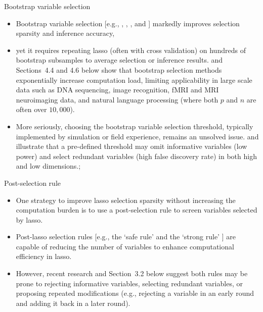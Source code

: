 \documentclass{beamer}
\begin{document}
\begin{frame}{Bootstrap variable selection}
  \begin{itemize}
      \item Bootstrap variable selection [e.g., \citet{bach2008bolasso}, \citet{meinshausen2010stability}, \citet{wang2011random}, and \citet{mameli2017estimating}] markedly improves selection sparsity and inference accuracy,
      \item yet it requires repeating lasso (often with cross validation) on hundreds of bootstrap subsamples to average selection or inference results. \citet{xu2012asymptotic} and Sections~4.4 and 4.6 below show that bootstrap selection methods exponentially increase computation load, limiting applicability in large scale data such as DNA sequencing, image recognition, fMRI and MRI neuroimaging data, and natural language processing (where both $p$ and $n$ are often over $10,000$). 
      \item More seriously, choosing the bootstrap variable selection threshold, typically implemented by simulation or field experience, remains an unsolved issue. \citet{bach2008bolasso} and \citet[Figure~2]{huang2014stat} illustrate that a pre-defined threshold may omit informative variables (low power) and select redundant variables (high false discovery rate) in both high and low dimensions.;
  \end{itemize}
\end{frame}


\begin{frame}{Post-selection rule}
  \begin{itemize}
    \item One strategy to improve lasso selection sparsity without increasing the computation burden is to use a post-selection rule to screen variables selected by lasso. 
    
    \item Post-lasso selection rules [e.g., the `safe rule' \citep{ghaoui2010safe} and the `strong rule' \citep{tibshirani2012strong}] are capable of reducing the number of variables to enhance computational efficiency in lasso. 
    
    \item However, recent research \citep{wang2014safe, zeng2017efficient} and Section~3.2 below suggest both rules may be prone to rejecting informative variables, selecting redundant variables, or proposing repeated modifications (e.g., rejecting a variable in an early round and adding it back in a later round).
  \end{itemize}
\end{frame}
\end{document}
